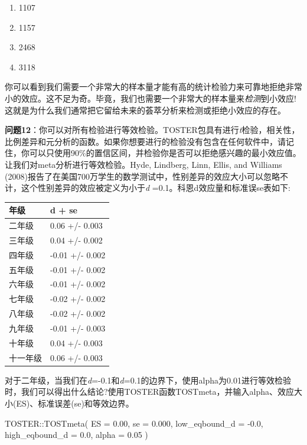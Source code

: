 \documentclass[
  letterpaper,
  DIV=11,
  numbers=noendperiod]{scrreprt}
\newenvironment{Shaded}{\begin{snugshade}}{\end{snugshade}}
\newcommand{\AttributeTok}[1]{\textcolor[rgb]{0.40,0.45,0.13}{#1}}
\newcommand{\FloatTok}[1]{\textcolor[rgb]{0.68,0.00,0.00}{#1}}
\newcommand{\FunctionTok}[1]{\textcolor[rgb]{0.28,0.35,0.67}{#1}}
\newcommand{\NormalTok}[1]{\textcolor[rgb]{0.00,0.23,0.31}{#1}}
\newcommand{\SpecialCharTok}[1]{\textcolor[rgb]{0.37,0.37,0.37}{#1}}
\providecommand{\tightlist}{%
  \setlength{\itemsep}{0pt}\setlength{\parskip}{0pt}}\usepackage{longtable,booktabs,array}
\begin{document}
\begin{enumerate}
\def\labelenumi{\Alph{enumi})}
\tightlist
\item
  1107
\item
  1157
\item
  2468
\item
  3118
\end{enumerate}

你可以看到我们需要一个非常大的样本量才能有高的统计检验力来可靠地拒绝非常小的效应。这不足为奇。毕竟，我们也需要一个非常大的样本量来\emph{检测}到小效应!这就是为什么我们通常把它留给未来的荟萃分析来检测或拒绝小效应的存在。

\textbf{问题12}：你可以对所有检验进行等效检验。TOSTER包具有进行\emph{t}检验，相关性，比例差异和元分析的函数。如果你想要进行的检验没有包含在任何软件中，请记住，你可以只使用90\%的置信区间，并检验你是否可以拒绝感兴趣的最小效应值。让我们对meta分析进行等效检验。Hyde,
Lindberg, Linn, Ellis, and Williams
(2008)报告了在美国700万学生的数学测试中，性别差异的效应大小可以忽略不计，这个性别差异的效应被定义为小于\emph{d}
=0.1。科恩d效应量和标准误se表如下:

\begin{longtable}[]{@{}ll@{}}
\toprule\noalign{}
\textbf{年级} & \textbf{d + se} \\
\midrule\noalign{}
\endhead
\bottomrule\noalign{}
\endlastfoot
二年级 & 0.06 +/- 0.003 \\
三年级 & 0.04 +/- 0.002 \\
四年级 & -0.01 +/- 0.002 \\
五年级 & -0.01 +/- 0.002 \\
六年级 & -0.01 +/- 0.002 \\
七年级 & -0.02 +/- 0.002 \\
八年级 & -0.02 +/- 0.002 \\
九年级 & -0.01 +/- 0.003 \\
十年级 & 0.04 +/- 0.003 \\
十一年级 & 0.06 +/- 0.003 \\
\end{longtable}

对于二年级，当我们在\emph{d}=-0.1和\emph{d}=0.1的边界下，使用alpha为0.01进行等效检验时，我们可以得出什么结论?使用TOSTER函数TOSTmeta，并输入alpha、效应大小(ES)、标准误差(se)和等效边界。

\begin{Shaded}
\begin{Highlighting}[]
\NormalTok{TOSTER}\SpecialCharTok{::}\FunctionTok{TOSTmeta}\NormalTok{(}
  \AttributeTok{ES =} \FloatTok{0.00}\NormalTok{,}
  \AttributeTok{se =} \FloatTok{0.000}\NormalTok{,}
  \AttributeTok{low\_eqbound\_d =} \SpecialCharTok{{-}}\FloatTok{0.0}\NormalTok{,}
  \AttributeTok{high\_eqbound\_d =} \FloatTok{0.0}\NormalTok{,}
  \AttributeTok{alpha =} \FloatTok{0.05}
\NormalTok{)}
\end{Highlighting}
\end{Shaded}
\end{document}
